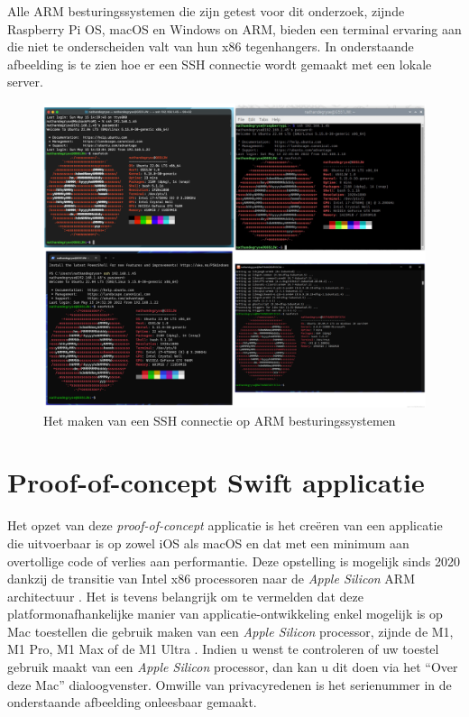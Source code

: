 \pagebreak
Alle ARM besturingssystemen die zijn getest voor dit onderzoek, zijnde Raspberry Pi OS, macOS en Windows on ARM, bieden een terminal ervaring aan die niet te onderscheiden valt van hun x86 tegenhangers. In onderstaande afbeelding is te zien hoe er een SSH connectie wordt gemaakt met een lokale server. 

\begin{figure}[!h]
	\centering
	\includegraphics[width=\linewidth]{img/ssh.png}
	\caption{Het maken van een SSH connectie op ARM besturingssystemen}
\end{figure}

\pagebreak
\section{Proof-of-concept Swift applicatie}
Het opzet van deze \textit{proof-of-concept} applicatie is het creëren van een applicatie die uitvoerbaar is op zowel iOS als macOS en dat met een minimum aan overtollige code of verlies aan performantie. Deze opstelling is mogelijk sinds 2020 dankzij de transitie van Intel x86 processoren naar de \textit{Apple Silicon} ARM architectuur \autocite{Apple2020}. Het is tevens belangrijk om te vermelden dat deze platformonafhankelijke manier van applicatie-ontwikkeling enkel mogelijk is op Mac toestellen die gebruik maken van een \textit{Apple Silicon} processor, zijnde de M1, M1 Pro, M1 Max of de M1 Ultra \autocite{AppleDeveloper2022a}. Indien u wenst te controleren of uw toestel gebruik maakt van een \textit{Apple Silicon} processor, dan kan u dit doen via het “Over deze Mac” dialoogvenster. Omwille van privacyredenen is het serienummer in de onderstaande afbeelding onleesbaar gemaakt.

